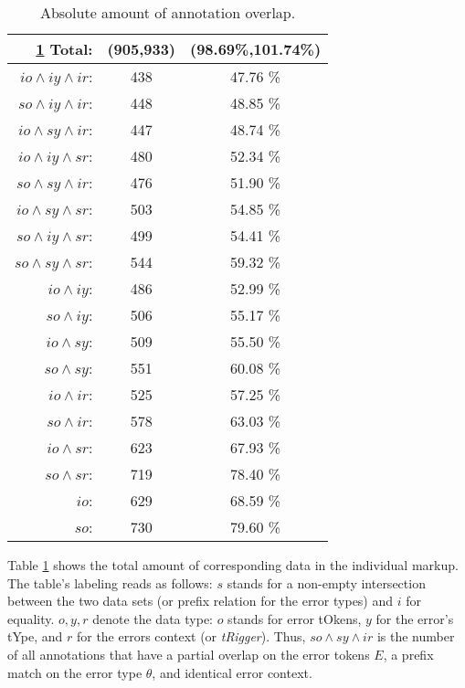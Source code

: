 \documentclass[12pt]{scrartcl}
\begin{document}
\begin{table}
  \centering
\begin{tabular}{r|c|c}\ref{tab:1}
  Total: & (905,933)& (98.69\%,101.74\%)\\\hline
  $io \wedge iy \wedge ir$:& 438 & 47.76 \%\\
  $so \wedge iy \wedge ir$:& 448 & 48.85 \%\\
  $io \wedge sy \wedge ir$:& 447 & 48.74 \%\\
  $io \wedge iy \wedge sr$:& 480 & 52.34 \%\\
  $so \wedge sy \wedge ir$:& 476 & 51.90 \%\\
  $io \wedge sy \wedge sr$:& 503 & 54.85 \%\\
  $so \wedge iy \wedge sr$:& 499 & 54.41 \%\\
  $so \wedge sy \wedge sr$:& 544 & 59.32 \%\\
  $     io \wedge iy$:& 486      & 52.99 \%\\
  $     so \wedge iy$:& 506      & 55.17 \%\\
  $     io \wedge sy$:& 509      & 55.50 \%\\
  $     so \wedge sy$:& 551      & 60.08 \%\\
  $     io \wedge ir$:& 525      & 57.25 \%\\
  $     so \wedge ir$:& 578      & 63.03 \%\\
  $     io \wedge sr$:& 623      & 67.93 \%\\
  $     so \wedge sr$:& 719      & 78.40 \%\\
  $          io$:& 629           & 68.59 \%\\
  $          so$:& 730           & 79.60 \%\\
\end{tabular}
\caption{Absolute amount of annotation overlap.}\label{tab:1}

\end{table}

Table \ref{tab:1} shows the total amount of corresponding data in the individual
markup. The table's labeling reads as follows: $s$ stands for a non-empty
intersection between the two data sets (or prefix relation for the error types)
and $i$ for equality.  $o,y,r$ denote the data type: $o$ stands for error
tOkens, $y$ for the error's tYpe, and $r$ for the errors context (or
\textit{tRigger}). Thus, $so\wedge sy\wedge ir$ is the number of all annotations
that have a partial overlap on the error tokens $E$, a prefix match on the error
type $\theta$, and identical error context.
\end{document}
